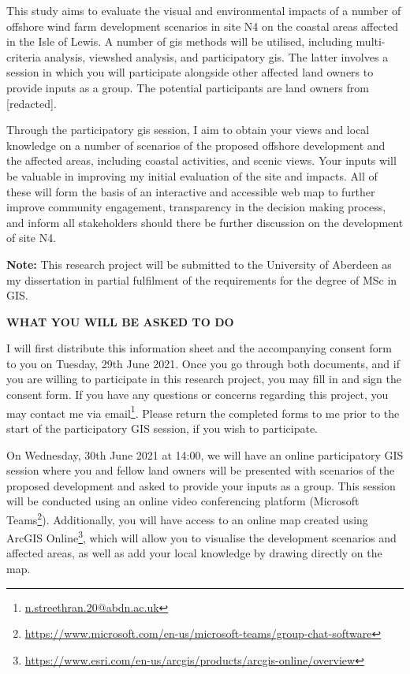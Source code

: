 {This study aims to evaluate the visual and environmental impacts of a number of offshore wind farm development scenarios in site N4 on the coastal areas affected in the Isle of Lewis. A number of \gls{gis} methods will be utilised, including multi-criteria analysis, viewshed analysis, and participatory \gls{gis}. The latter involves a session in which you will participate alongside other affected land owners to provide inputs as a group. The potential participants are land owners from [redacted].

Through the participatory \gls{gis} session, I aim to obtain your views and local knowledge on a number of scenarios of the proposed offshore development and the affected areas, including coastal activities, and scenic views. Your inputs will be valuable in improving my initial evaluation of the site and impacts. All of these will form the basis of an interactive and accessible web map to further improve community engagement, transparency in the decision making process, and inform all stakeholders should there be further discussion on the development of site N4.

\textbf{Note:} This research project will be submitted to the University of Aberdeen as my dissertation in partial fulfilment of the requirements for the degree of MSc in GIS.

\vspace{20pt}
\textbf{\MakeUppercase{What you will be asked to do}}

I will first distribute this information sheet and the accompanying consent form to you on Tuesday, 29th June 2021. Once you go through both documents, and if you are willing to participate in this research project, you may fill in and sign the consent form. If you have any questions or concerns regarding this project, you may contact me via email\footnote{\href{mailto:n.streethran.20@abdn.ac.uk}{n.streethran.20@abdn.ac.uk}\label{fn:email}}. Please return the completed forms to me prior to the start of the participatory GIS session, if you wish to participate.

On Wednesday, 30th June 2021 at 14:00, we will have an online participatory GIS session where you and fellow land owners will be presented with scenarios of the proposed development and asked to provide your inputs as a group. This session will be conducted using an online video conferencing platform (Microsoft Teams\footnote{\url{https://www.microsoft.com/en-us/microsoft-teams/group-chat-software}}). Additionally, you will have access to an online map created using ArcGIS Online\footnote{\url{https://www.esri.com/en-us/arcgis/products/arcgis-online/overview}}, which will allow you to visualise the development scenarios and affected areas, as well as add your local knowledge by drawing directly on the map.

}
